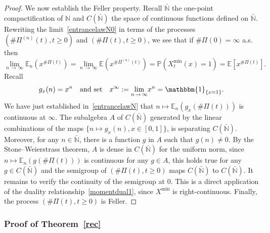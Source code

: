 \documentclass[AHL,Unicode,longabstracts,published]{cedram}
\newcommand{\bbmun}{\mathbbm{1}}
\newcommand{\bbN}{\mathbb{N}}
\newcommand{\bbE}{\mathbb{E}}
\newcommand{\bbP}{\mathbb{P}}
\begin{document}
\begin{proof}
We now establish the Feller property. Recall $\bar{\bbN}$ the one-point compactification of $\bbN$ and $C(\bar{\bbN})$ the space of continuous functions defined on $\bar{\bbN}$. Rewriting the limit~\eqref{entrancelawN0} in terms of the processes $(\#\Pi^{(n)}(t),t\geq 0)$ and $(\#\Pi(t),t\geq 0)$, we see that if $\#\Pi(0)=\infty$ a.s. then
\begin{equation}\label{entrancelawN}
\underset{n\,\rightarrow\,\infty}{\lim} \bbE_n\left(x^{\#\Pi(t)}\right)=\underset{n\,\rightarrow\,\infty}{\lim} \bbE\left(x^{\#\Pi^{(n)}(t)}\right)=\bbP(X_t^{\min}(x)=1)=\bbE\left[x^{\#\Pi(t)}\right].
\end{equation}
Recall
\[
g_x(n)=x^{n}\quad \text{and set}\quad x^{\infty}:=\underset{n\,\rightarrow\,\infty}{\lim} x^{n}=\bbmun_{\{x=1\}}.
\]
We have just established in~\eqref{entrancelawN} that $n\mapsto \bbE_n(g_x(\#\Pi(t)))$ is continuous at $\infty$. The subalgebra $A$ of $C(\bar{\bbN})$ generated by the linear combinations of the maps $\{n\mapsto g_x(n), x\in [0,1]\}$, is separating $C(\bar{\bbN})$. Moreover, for any $n\in \bar{\bbN}$, there is a function $g$ in $A$ such that $g(n)\neq 0$. By the Stone--Weierstrass theorem, $A$ is dense in $C(\bar{\bbN})$ for the uniform norm, since $n\mapsto \bbE_n(g(\#\Pi(t))) $ is continuous for any $g\in A$, this holds true for any $g\in C(\bar{\bbN})$ and the semigroup of $(\#\Pi(t),t\geq 0)$ maps $C(\bar{\bbN})$ to $C(\bar{\bbN})$. It remains to verify the continuity of the semigroup at $0$. This is a direct application of the duality relationship~\eqref{momentdual1}, since $X^{\min}$ is right-continuous. Finally, the process $(\#\Pi(t),t\geq 0)$ is Feller.
\end{proof}

\subsubsection{Proof of Theorem~\ref{rec}}
\end{document}
